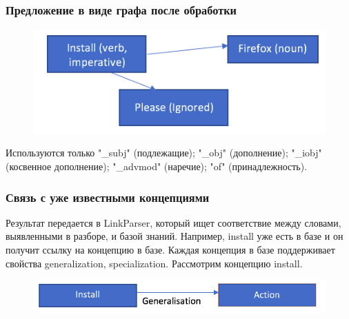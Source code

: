 \documentclass[14pt]{beamer}
\begin{document}
\begin{frame}
\frametitle{Предложение в виде графа после обработки}
\begin{figure} [h] 
  \center
  \includegraphics [scale=0.5] {LexicalGraph2}
  \label{img:LexicalGraph2}  
\end{figure}
Используются только "\_subj" (подлежащие); "\_obj" (дополнение); "\_iobj" (косвенное дополнение); "\_advmod" (наречие); "of" (принадлежность).
\end{frame}



\begin{frame}
\frametitle{Связь с уже известными концепциями}
Результат передается в LinkParser, который ищет соответствие между словами, выявленными в разборе, и базой знаний. Например, install уже есть в базе и он получит ссылку на концепцию в базе. Каждая концепция в базе поддерживает свойства generalization, specialization. Рассмотрим концепцию install.
\begin{figure} [h] 
  \center
  \includegraphics [scale=0.5] {Generalisation1}
  \label{img:Generalisation1}  
\end{figure}
\end{frame}


\end{document}

